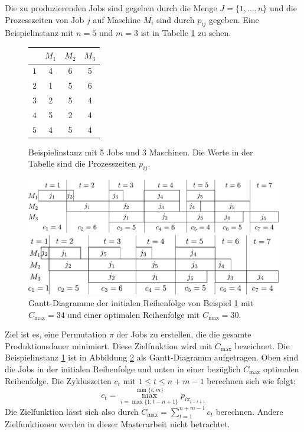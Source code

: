 \documentclass{scrreprt}
\begin{document}
Die zu produzierenden Jobs sind gegeben durch die Menge $J=\{1,\ldots,n\}$ 
und die Prozesszeiten von Job $j$ auf Maschine $M_i$ sind durch $p_{ij}$ gegeben.
Eine Beispielinstanz mit $n=5$ und $m=3$ ist in Tabelle \ref{abb:Bsp} zu sehen.
\begin{figure}[h]
    \begin{center}
        \begin{tabular}{c|ccc}
            & $M_1$ & $M_2$ & $M_3$ \\ \hline
            $1$ & 4 & 6 & 5 \\
            $2$ & 1 & 5 & 6 \\
            $3$ & 2 & 5 & 4 \\
            $4$ & 5 & 2 & 4 \\
            $5$ & 4 & 5 & 4
        \end{tabular}
    \end{center}
    \caption{
        \label{abb:Bsp}
        Beispielinstanz mit 5 Jobs und 3 Maschinen. Die Werte in der Tabelle sind die Prozesszeiten $p_{ij}$.
    }
\end{figure}
\begin{figure}
    \begin{center}
        \includegraphics[width=.8\textwidth]{graphics/bspinit.pdf}
    \end{center}
    \begin{center}
        \includegraphics[width=.8\textwidth]{graphics/bspopt.pdf}
    \end{center}
    \caption{
        \label{abb:gantt}
        Gantt-Diagramme der initialen Reihenfolge von Beispiel \ref{abb:Bsp} mit $C_{\max}=34$
        und einer optimalen Reihenfolge mit $C_{\max}=30$.
    }
\end{figure}
Ziel ist es, eine Permutation $\pi$ der Jobs zu erstellen, die die gesamte Produktionsdauer minimiert.
Diese Zielfunktion wird mit $C_{\max}$ bezeichnet.
Die Beispielinstanz \ref{abb:Bsp} ist in Abbildung \ref{abb:gantt} als Gantt-Diagramm aufgetragen.
Oben sind die Jobs in der initialen Reihenfolge und unten in einer bezüglich $C_{\max}$ optimalen Reihenfolge.
Die Zykluszeiten $c_t$ mit $1\leq t\leq n+m-1$ berechnen sich wie folgt:
\[ c_t = \max_{i=\max\{1,t-n+1\}}^{\min\{t,m\}} p_{i\pi_{t-i+1}} \]
Die Zielfunktion lässt sich also durch $C_{\max} = \sum_{t=1}^{n+m-1} c_t$ berechnen.
Andere Zielfunktionen werden in dieser Masterarbeit nicht betrachtet.
\end{document}
